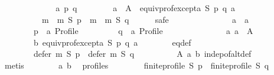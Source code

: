 \begin{isabellebody}
\ \ \isamarkupfalse%
\isanewline
\ \ \ \ \isamarkupfalse%
\isanewline
\ \ \ \ \ \ {\isachardoublequoteopen}{\isasymforall}a\ p\ q{\isachardot}{\kern0pt}\isanewline
\ \ \ \ \ \ \ \ a\ {\isasymin}\ A\ {\isasymand}\ equiv{\isacharunderscore}{\kern0pt}prof{\isacharunderscore}{\kern0pt}except{\isacharunderscore}{\kern0pt}a\ S\ p\ q\ a\ {\isasymlongrightarrow}\isanewline
\ \ \ \ \ \ \ \ \ \ {\isacharparenleft}{\kern0pt}m\ {\isasymtriangleright}\ m{}{\isacharparenright}{\kern0pt}\ S\ p\ {\isacharequal}{\kern0pt}\ {\isacharparenleft}{\kern0pt}m\ {\isasymtriangleright}\ m{}{\isacharparenright}{\kern0pt}\ S\ q{\isachardoublequoteclose}\isanewline
\ \ \ \ \isamarkupfalse%
\ {\isacharparenleft}{\kern0pt}safe{\isacharparenright}{\kern0pt}\isanewline
\ \ \ \ \ \ \isamarkupfalse%
\isanewline
\ \ \ \ \ \ \ \ a\ {\isacharcolon}{\kern0pt}{\isacharcolon}{\kern0pt}\ {\isachardoublequoteopen}{\isacharprime}{\kern0pt}a{\isachardoublequoteclose}\ \isanewline
\ \ \ \ \ \ \ \ p\ {\isacharcolon}{\kern0pt}{\isacharcolon}{\kern0pt}\ {\isachardoublequoteopen}{\isacharprime}{\kern0pt}a\ Profile{\isachardoublequoteclose}\ \isanewline
\ \ \ \ \ \ \ \ q\ {\isacharcolon}{\kern0pt}{\isacharcolon}{\kern0pt}\ {\isachardoublequoteopen}{\isacharprime}{\kern0pt}a\ Profile{\isachardoublequoteclose}\isanewline
\ \ \ \ \ \ \isamarkupfalse%
\isanewline
\ \ \ \ \ \ \ \ a{\isacharcolon}{\kern0pt}\ {\isachardoublequoteopen}a\ {\isasymin}\ A{\isachardoublequoteclose}\ \isanewline
\ \ \ \ \ \ \ \ b{\isacharcolon}{\kern0pt}\ {\isachardoublequoteopen}equiv{\isacharunderscore}{\kern0pt}prof{\isacharunderscore}{\kern0pt}except{\isacharunderscore}{\kern0pt}a\ S\ p\ q\ a{\isachardoublequoteclose}\isanewline
\ \ \ \ \ \ \isamarkupfalse%
\ eq{\isacharunderscore}{\kern0pt}def{\isacharcolon}{\kern0pt}\isanewline
\ \ \ \ \ \ \ \ {\isachardoublequoteopen}defer\ m\ S\ p\ {\isacharequal}{\kern0pt}\ defer\ m\ S\ q{\isachardoublequoteclose}\isanewline
\ \ \ \ \ \ \ \ \isamarkupfalse%
\ A\ a\ b\ indep{\isacharunderscore}{\kern0pt}of{\isacharunderscore}{\kern0pt}alt{\isacharunderscore}{\kern0pt}def\isanewline
\ \ \ \ \ \ \ \ \isamarkupfalse%
\ metis\isanewline
\ \ \ \ \ \ \isamarkupfalse%
\ a\ b\ \isamarkupfalse%
\ profiles{\isacharcolon}{\kern0pt}\isanewline
\ \ \ \ \ \ \ \ {\isachardoublequoteopen}finite{\isacharunderscore}{\kern0pt}profile\ S\ p\ {\isasymand}\ finite{\isacharunderscore}{\kern0pt}profile\ S\ q{\isachardoublequoteclose}\isanewline

\end{isabellebody}
